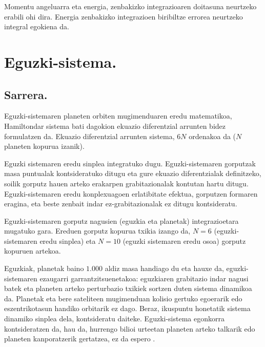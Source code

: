 Momentu angeluarra eta energia, zenbakizko integrazioaren doitasuna neurtzeko erabili ohi dira. Energia zenbakizko integrazioen biribiltze errorea neurtzeko integral egokiena da.

\section{Eguzki-sistema.}
\label{ss:34}

\subsection{Sarrera.}

Eguzki-sistemaren planeten orbiten mugimenduaren eredu matematikoa, Hamiltondar sistema bati dagokion ekuazio diferentzial arrunten bidez formulatzen da. Ekuazio diferentzial arrunten sistema, $6N$ ordenakoa da ($N$ planeten kopurua izanik).

Eguzki sistemaren eredu sinplea integratuko dugu. Eguzki-sistemaren gorputzak masa puntualak kontsideratuko ditugu eta gure ekuazio diferentzialak definitzeko, soilik gorputz hauen arteko erakarpen grabitazionalak kontutan hartu ditugu. Eguzki-sistemaren eredu konplexuagoen erlatibitate efektua, gorputzen formaren eragina, eta beste zenbait indar ez-grabitazionalak ez ditugu kontsideratu.

Eguzki-sistemaren gorputz nagusien (eguzkia eta planetak) integrazioetara mugatuko gara. Ereduen gorputz kopurua txikia izango da, $N=6$ (eguzki-sistemaren eredu sinplea) eta $N=10$ (eguzki sistemaren eredu osoa) gorputz kopuruen artekoa.

Eguzkiak, planetak baino $1.000$ aldiz masa handiago du eta hauxe da, eguzki-sistemaren ezaugarri garrantzitsuenetakoa: eguzkiaren grabitazio indar nagusi batek eta planeten arteko perturbazio txikiek sortzen duten sistema dinamikoa da. Planetak eta bere sateliteen mugimenduan kolisio gertuko egoerarik edo eszentrikotasun handiko orbitarik ez dago. Beraz, ikuspuntu honetatik sistema dinamiko sinplea dela, kontsideratu daiteke. Eguzki-sistema egonkorra kontsideratzen da, hau da, hurrengo bilioi urteetan  planeten arteko talkarik edo planeten kanporatzerik gertatzea, ez da espero  \cite{Laskar1999} \cite{Hayes2007}.

